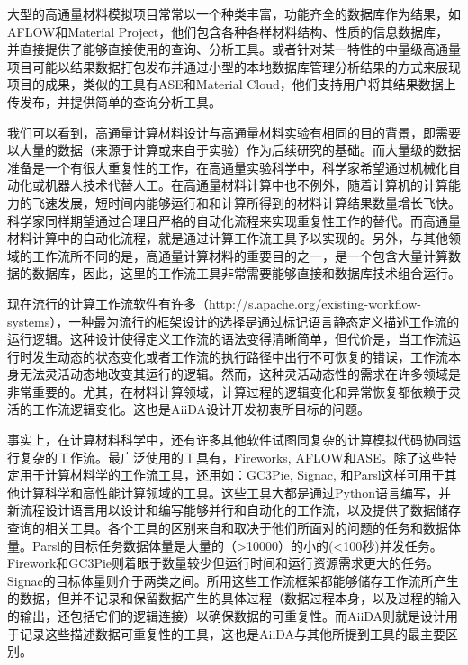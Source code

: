大型的高通量材料模拟项目常常以一个种类丰富，功能齐全的数据库作为结果，如AFLOW\cite{curtarolo2012aflowlib}和Material Project\cite{jain2011high}，他们包含各种各样材料结构、性质的信息数据库，并直接提供了能够直接使用的查询、分析工具。或者针对某一特性的中量级高通量项目可能以结果数据打包发布并通过小型的本地数据库管理分析结果的方式来展现项目的成果，类似的工具有ASE\cite{larsen2017atomic}和Material Cloud\cite{talirz2020materials}，他们支持用户将其结果数据上传发布，并提供简单的查询分析工具。

我们可以看到，高通量计算材料设计与高通量材料实验有相同的目的背景，即需要以大量的数据（来源于计算或来自于实验）作为后续研究的基础。而大量级的数据准备是一个有很大重复性的工作，在高通量实验科学中，科学家希望通过机械化自动化或机器人技术代替人工。在高通量材料计算中也不例外，随着计算机的计算能力的飞速发展，短时间内能够运行和和计算所得到的材料计算结果数量增长飞快。科学家同样期望通过合理且严格的自动化流程来实现重复性工作的替代。而高通量材料计算中的自动化流程，就是通过计算工作流工具予以实现的。另外，与其他领域的工作流所不同的是，高通量计算材料的重要目的之一，是一个包含大量计算数据的数据库，因此，这里的工作流工具非常需要能够直接和数据库技术组合运行。

现在流行的计算工作流软件有许多（\url{http://s.apache.org/existing-workflow-systems}），一种最为流行的框架设计的选择是通过标记语言静态定义描述工作流的运行逻辑。这种设计使得定义工作流的语法变得清晰简单，但代价是，当工作流运行时发生动态的状态变化或者工作流的执行路径中出行不可恢复的错误，工作流本身无法灵活动态地改变其运行的逻辑。然而，这种灵活动态性的需求在许多领域是非常重要的。尤其，在材料计算领域，计算过程的逻辑变化和异常恢复都依赖于灵活的工作流逻辑变化。这也是AiiDA设计开发初衷所目标的问题。

事实上，在计算材料科学中，还有许多其他软件试图同复杂的计算模拟代码协同运行复杂的工作流。最广泛使用的工具有，Fireworks\cite{jain2015fireworks}, AFLOW\cite{curtarolo2012aflow}和ASE\cite{larsen2017atomic}。除了这些特定用于计算材料学的工作流工具，还用如：GC3Pie\cite{maffioletti2012gc3pie}, Signac\cite{adorf2018simple}, 和Parsl\cite{babuji2019parsl}这样可用于其他计算科学和高性能计算领域的工具。这些工具大都是通过Python语言编写，并新流程设计语言用以设计和编写能够并行和自动化的工作流，以及提供了数据储存查询的相关工具。各个工具的区别来自和取决于他们所面对的问题的任务和数据体量。Parsl的目标任务数据体量是大量的（>10000）的小的(<100秒)并发任务。Firework和GC3Pie则着眼于数量较少但运行时间和运行资源需求更大的任务。Signac的目标体量则介于两类之间。所用这些工作流框架都能够储存工作流所产生的数据，但并不记录和保留数据产生的具体过程（数据过程本身，以及过程的输入的输出，还包括它们的逻辑连接）以确保数据的可重复性。而AiiDA则就是设计用于记录这些描述数据可重复性的工具，这也是AiiDA与其他所提到工具的最主要区别。

